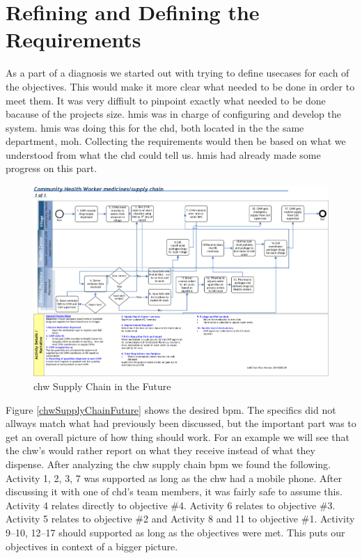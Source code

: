 \section{Refining and Defining the Requirements}
As a part of a diagnosis we started out with trying to define usecases for each of the objectives. 
This would make it more clear what needed to be done in order to meet them.
It was very diffiult to pinpoint exactly what needed to be done bacause of the projects size. 
\gls{hmis} was in charge of configuring and develop the system. \gls{hmis} was doing this for the \gls{chd}, both located in the the same department, \gls{moh}. 
Collecting the requirements would then be based on what we understood from what the \gls{chd} could tell us. \gls{hmis} had already made some progress on this part.  

\begin{figure}
\centering
\includegraphics[width=\textwidth]{case/img/chwSupplyChainFuture}
\caption{\gls{chw} Supply Chain in the Future}
\label{chwSupplyChainPresent}
\end{figure}

Figure \ref{chwSupplyChainFuture} shows the desired \gls{bpm}. The specifics did not allways match what had previously been discussed, but the important part was to get an overall picture of how thing should work. For an example we will see that the \gls{chw}'s would rather report on what they receive instead of what they dispense. After analyzing the \gls{chw} supply chain \gls{bpm} we found the following. 
Activity 1, 2, 3, 7 was supported as long as the \gls{chw} had a mobile phone. After discussing it with one of \gls{chd}'s team members, it was fairly safe to assume this. 
Activity 4 relates directly to objective \#4.
Activity 6 relates to objective \#3. 
Activity 5 relates to objective \#2 and Activity 8 and 11 to objective \#1. Activity 9--10, 12--17 should supported as long as the objectives were met. 
This puts our objectives in context of a bigger picture.

